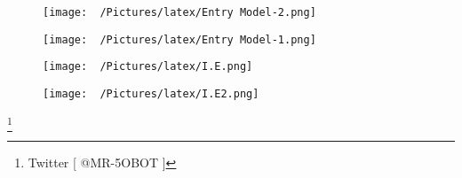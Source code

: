 \documentclass{article}
\begin{document}
\begin{figure}[h!]
\begin{adjustbox}{width=1.15\textwidth,center}
  \texttt{[image: ~/Pictures/latex/Entry Model-2.png]}
\end{adjustbox}
  \label{fig:image}
\end{figure}

\begin{figure}[h!]
\begin{adjustbox}{width=1.15\textwidth,center}
  \texttt{[image: ~/Pictures/latex/Entry Model-1.png]}
\end{adjustbox}
  \label{fig:image}
\end{figure}

\begin{figure}[h!]
\begin{adjustbox}{width=1.15\textwidth,center}
  \texttt{[image: ~/Pictures/latex/I.E.png]}
\end{adjustbox}
  \label{fig:image}
\end{figure}

\begin{figure}[h!]
\begin{adjustbox}{width=1.15\textwidth,center}
  \texttt{[image: ~/Pictures/latex/I.E2.png]}
\end{adjustbox}
  \label{fig:image}
\end{figure}


\footnote{Twitter [ @MR-5OBOT ]}
\end{document}
